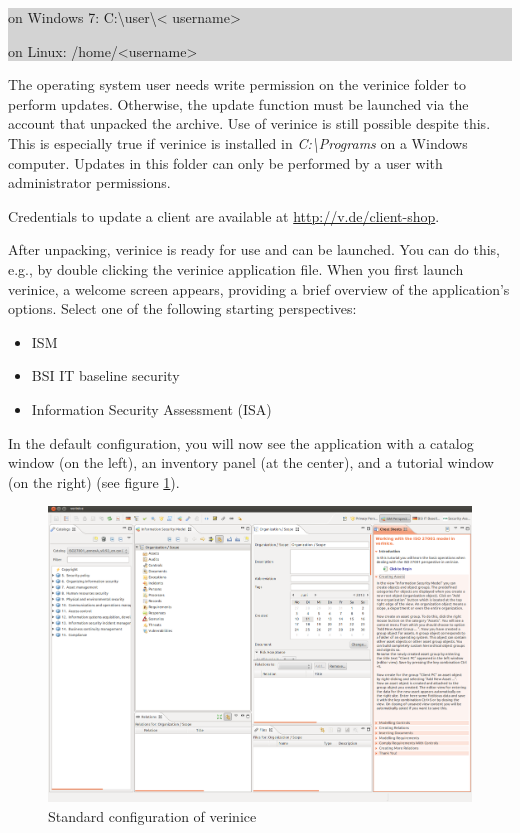 \documentclass[a4paper,10pt]{book}
\begin{document}
\colorbox{lightgray}{\parbox{\textwidth}{
\begin{itemize}
  {\em
    \item on Windows 7: C:\textbackslash user\textbackslash\textless
      username\textgreater
    \item on Linux: /home/\textless username\textgreater
  }
\end{itemize}
}}

The operating system user needs write permission on the verinice folder to
perform updates. Otherwise, the update function must be launched via the
account that unpacked the archive. Use of verinice is still possible
despite this. This is especially true if verinice is installed in
{\em C:\textbackslash Programs} on a Windows computer. Updates in this folder
can only be performed by a user with administrator permissions.

Credentials to update a client are available at \url{http://v.de/client-shop}.

After unpacking, verinice is ready for use and can be launched. You can do
this, e.g., by double clicking the verinice application file. When you first
launch verinice, a welcome screen appears, providing a brief overview of the
application's options. Select one of the following starting perspectives:
\begin{itemize}
  \item ISM
  \item BSI IT baseline security
  \item Information Security Assessment (ISA)
\end{itemize}
In the default configuration, you will now see the application with a catalog
window (on the left), an inventory panel (at the center), and a tutorial
window (on the right) (see figure \ref{Standard configuration of verinice}).
\begin{figure}[htb!]
  \centering
  \includegraphics[scale=.24]{Screenshot/ISM-Perspektive-en.png}
  \caption{
    \label{Standard configuration of verinice} Standard configuration
      of verinice
  }
\end{figure}
\end{document}
